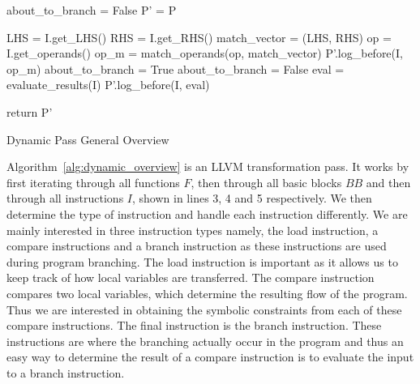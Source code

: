 \begin{algorithm}[t]
    \SetAlgoLined

    about\_to\_branch = False\;
    P' = P\;

    {
        {
            {
                {
                    LHS = I.get\_LHS()\;
                    RHS = I.get\_RHS()\;
                    match\_vector = (LHS, RHS)\;
                }
                {
                    op = I.get\_operands()\;
                    op\_m = match\_operands(op, match\_vector)\;
                    P'.log\_before(I, op\_m)\;
                    about\_to\_branch = True\;
                }
                {
                    {
                        about\_to\_branch = False\;
                        eval = evaluate\_results(I)\;
                        P'.log\_before(I, eval)\;
                    }
                }
            }
        }
    }
    
    return P'
 \caption{Dynamic Pass General Overview}
 \label{alg:dynamic_overview}
\end{algorithm}

Algorithm~\ref{alg:dynamic_overview} is an LLVM transformation pass. It works by first iterating through all functions $F$, then through all basic blocks $BB$ and then through all instructions $I$, shown in lines 3, 4 and 5 respectively. We then determine the type of instruction and handle each instruction differently. We are mainly interested in three instruction types namely, the load instruction, a compare instructions and a branch instruction as these instructions are used during program branching. The load instruction is important as it allows us to keep track of how local variables are transferred. The compare instruction compares two local variables, which determine the resulting flow of the program. Thus we are interested in obtaining the symbolic constraints from each of these compare instructions. The final instruction is the branch instruction. These instructions are where the branching actually occur in the program and thus an easy way to determine the result of a compare instruction is to evaluate the input to a branch instruction.  

